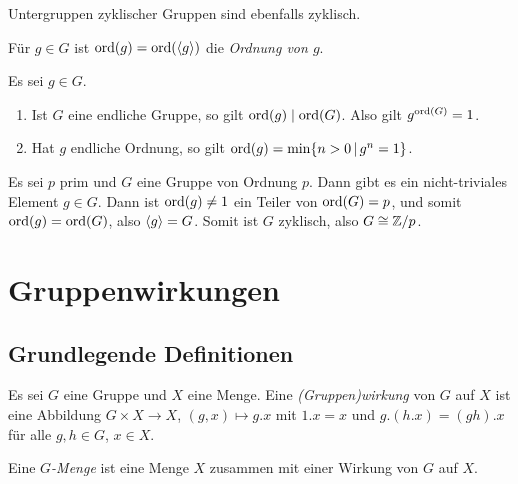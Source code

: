 \begin{corollary}
  Untergruppen zyklischer Gruppen sind ebenfalls zyklisch.
\end{corollary}

\begin{definition}
  Für $g \in G$ ist $\operatorname{ord}(g) = \operatorname{ord}(\langle g\rangle)$ die \emph{Ordnung von $g$}.
\end{definition}

\begin{lemma}
  Es sei $g \in G$.
  \begin{enumerate}
    \item
      Ist $G$ eine endliche Gruppe, so gilt $\operatorname{ord}(g) \mathrel{|} \operatorname{ord}(G)$.
      Also gilt $g^{\operatorname{ord}(G)} = 1$.
    \item
      Hat $g$ endliche Ordnung, so gilt $\ord{g} = \min \{ n > 0 \suchthat g^n = 1 \}$.
  \end{enumerate}
\end{lemma}

\begin{example}
  Es sei $p$ prim und $G$ eine Gruppe von Ordnung $p$.
  Dann gibt es ein nicht-triviales Element $g \in G$.
  Dann ist $\operatorname{ord}(g) \neq 1$ ein Teiler von $\operatorname{ord}(G) = p$, und somit $\operatorname{ord}(g) = \operatorname{ord}(G)$, also $\langle g\rangle = G$.
  Somit ist $G$ zyklisch, also $G \cong \mathbb{Z}/p$.
\end{example}






\section{Gruppenwirkungen}



\subsection{Grundlegende Definitionen}

\begin{definition}
  Es sei $G$ eine Gruppe und $X$ eine Menge.
  Eine \emph{\textup(Gruppen\textup)wirkung} von $G$ auf $X$ ist eine Abbildung $G \times X \to X$, $(g,x) \mapsto g.x$ mit $1.x = x$ und $g.(h.x) = (gh).x$ für alle $g, h \in G$, $x \in X$.
  
  Eine \emph{$G$-Menge} ist eine Menge $X$ zusammen mit einer Wirkung von $G$ auf $X$.
\end{definition}

